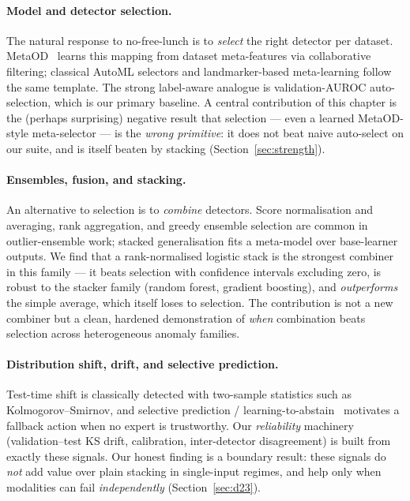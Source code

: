\documentclass[11pt,titlepage]{article}
\begin{document}
\paragraph{Model and detector selection.} The natural response to no-free-lunch is to
\emph{select} the right detector per dataset. MetaOD~\cite{metaod_th} learns this
mapping from dataset meta-features via collaborative filtering; classical AutoML
selectors and landmarker-based meta-learning follow the same template. The strong
label-aware analogue is validation-AUROC auto-selection, which is our primary
baseline. A central contribution of this chapter is the (perhaps surprising) negative
result that selection --- even a learned MetaOD-style meta-selector --- is the
\emph{wrong primitive}: it does not beat naive auto-select on our suite, and is itself
beaten by stacking (Section~\ref{sec:strength}).

\paragraph{Ensembles, fusion, and stacking.} An alternative to selection is to
\emph{combine} detectors. Score normalisation and averaging, rank aggregation, and
greedy ensemble selection are common in outlier-ensemble work; stacked generalisation
\cite{wolpert_th} fits a meta-model over base-learner outputs. We find that a
rank-normalised logistic stack is the strongest combiner in this family --- it beats
selection with confidence intervals excluding zero, is robust to the stacker family
(random forest, gradient boosting), and \emph{outperforms} the simple average, which
itself loses to selection. The contribution is not a new combiner but a clean,
hardened demonstration of \emph{when} combination beats selection across heterogeneous
anomaly families.

\paragraph{Distribution shift, drift, and selective prediction.} Test-time shift is
classically detected with two-sample statistics such as Kolmogorov--Smirnov, and
selective prediction / learning-to-abstain~\cite{geifman_th} motivates a fallback
action when no expert is trustworthy. Our \emph{reliability} machinery (validation--test
KS drift, calibration, inter-detector disagreement) is built from exactly these
signals. Our honest finding is a boundary result: these signals do \emph{not} add
value over plain stacking in single-input regimes, and help only when modalities can
fail \emph{independently} (Section~\ref{sec:d23}).
\end{document}
